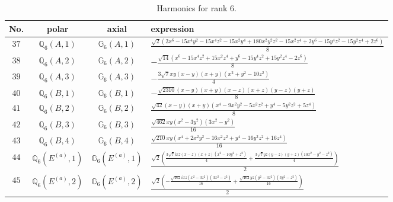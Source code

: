 \documentclass[fleqn,8pt,landscape]{jsarticle}
\begin{document}
\begin{table}[ht!]
\begin{center}
\caption{Harmonics for rank 6.}
\renewcommand{\arraystretch}{1.3}
\begin{tabular}{cccl} \hline \hline
No. & polar & axial & expression \\ \hline
$ 37 $ & $ \mathbb{Q}_{6}(A,1) $ & $ \mathbb{G}_{6}(A,1) $ & $ \frac{\sqrt{2} \left(2 x^{6} - 15 x^{4} y^{2} - 15 x^{4} z^{2} - 15 x^{2} y^{4} + 180 x^{2} y^{2} z^{2} - 15 x^{2} z^{4} + 2 y^{6} - 15 y^{4} z^{2} - 15 y^{2} z^{4} + 2 z^{6}\right)}{8} $ \\
$ 38 $ & $ \mathbb{Q}_{6}(A,2) $ & $ \mathbb{G}_{6}(A,2) $ & $ - \frac{\sqrt{14} \left(x^{6} - 15 x^{4} z^{2} + 15 x^{2} z^{4} + y^{6} - 15 y^{4} z^{2} + 15 y^{2} z^{4} - 2 z^{6}\right)}{8} $ \\
$ 39 $ & $ \mathbb{Q}_{6}(A,3) $ & $ \mathbb{G}_{6}(A,3) $ & $ - \frac{3 \sqrt{7} x y \left(x - y\right) \left(x + y\right) \left(x^{2} + y^{2} - 10 z^{2}\right)}{4} $ \\
$ 40 $ & $ \mathbb{Q}_{6}(B,1) $ & $ \mathbb{G}_{6}(B,1) $ & $ - \frac{\sqrt{2310} \left(x - y\right) \left(x + y\right) \left(x - z\right) \left(x + z\right) \left(y - z\right) \left(y + z\right)}{8} $ \\
$ 41 $ & $ \mathbb{Q}_{6}(B,2) $ & $ \mathbb{G}_{6}(B,2) $ & $ \frac{\sqrt{42} \left(x - y\right) \left(x + y\right) \left(x^{4} - 9 x^{2} y^{2} - 5 x^{2} z^{2} + y^{4} - 5 y^{2} z^{2} + 5 z^{4}\right)}{8} $ \\
$ 42 $ & $ \mathbb{Q}_{6}(B,3) $ & $ \mathbb{G}_{6}(B,3) $ & $ \frac{\sqrt{462} x y \left(x^{2} - 3 y^{2}\right) \left(3 x^{2} - y^{2}\right)}{16} $ \\
$ 43 $ & $ \mathbb{Q}_{6}(B,4) $ & $ \mathbb{G}_{6}(B,4) $ & $ \frac{\sqrt{210} x y \left(x^{4} + 2 x^{2} y^{2} - 16 x^{2} z^{2} + y^{4} - 16 y^{2} z^{2} + 16 z^{4}\right)}{16} $ \\
$ 44 $ & $ \mathbb{Q}_{6}(E^{(a)},1) $ & $ \mathbb{G}_{6}(E^{(a)},1) $ & $ \frac{\sqrt{2} \left(\frac{3 \sqrt{7} i x z \left(x - z\right) \left(x + z\right) \left(x^{2} - 10 y^{2} + z^{2}\right)}{4} + \frac{3 \sqrt{7} y z \left(y - z\right) \left(y + z\right) \left(10 x^{2} - y^{2} - z^{2}\right)}{4}\right)}{2} $ \\
$ 45 $ & $ \mathbb{Q}_{6}(E^{(a)},2) $ & $ \mathbb{G}_{6}(E^{(a)},2) $ & $ \frac{\sqrt{2} \left(- \frac{\sqrt{462} i x z \left(x^{2} - 3 z^{2}\right) \left(3 x^{2} - z^{2}\right)}{16} + \frac{\sqrt{462} y z \left(y^{2} - 3 z^{2}\right) \left(3 y^{2} - z^{2}\right)}{16}\right)}{2} $ \\

\end{tabular}
\end{center}
\end{table}
\end{document}
